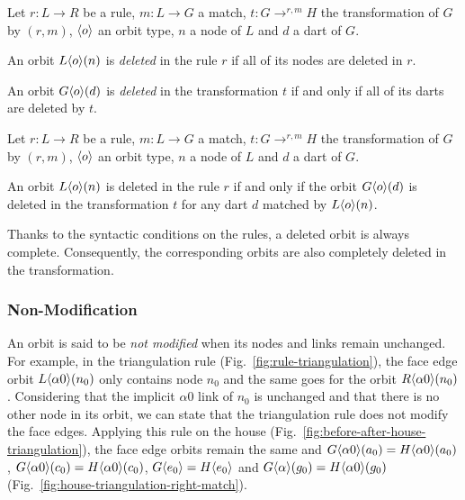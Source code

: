 \begin{definition}
    Let $r : L \longrightarrow R$ be a rule, $m : L \to G$ a match, $t : G \longrightarrow^{r,m} H$ the transformation of $G$ by $(r,m)$, $\langle o\rangle$ an orbit type, $n$ a node of $L$ and $d$ a dart of $G$.

    An orbit $L\langle o\rangle(n)$ is \emph{deleted} in the rule $r$ if all of its nodes are deleted in $r$.

    An orbit $G\langle o\rangle(d)$ is \emph{deleted} in the transformation $t$ if and only if all of its darts are deleted by $t$.
\end{definition}

\begin{proposition}
   Let $r : L \longrightarrow R$ be a rule, $m : L \to G$ a match, $t : G \longrightarrow^{r,m} H$ the transformation of $G$ by $(r,m)$, $\langle o\rangle$ an orbit type, $n$ a node of $L$ and $d$ a dart of $G$.

   An orbit $L\langle o\rangle(n)$ is deleted in the rule $r$ if and only if the orbit $G\langle o\rangle(d)$ is deleted in the transformation $t$ for any dart $d$ matched by $L\langle o\rangle(n)$.
\end{proposition}

\begin{proofidea}
  Thanks to the syntactic conditions on the rules, a deleted orbit is always complete.
  Consequently, the corresponding orbits are also completely deleted in the transformation.
\end{proofidea}


\subsubsection{Non-Modification}

An orbit is said to be \emph{not modified} when its nodes and links remain unchanged.
For example, in the triangulation rule (Fig.~\ref{fig:rule-triangulation}), the face edge orbit $L\langle\alpha 0\rangle(n_{0})$ only contains node $n_{0}$  and the same goes for the orbit $R\langle\alpha 0\rangle(n_{0})$.
Considering that the implicit $\alpha 0$ link of $n_{0}$ is unchanged and that there is no
other node in its orbit, we can state that the triangulation rule does not modify the face edges.
Applying this rule on the house (Fig.~\ref{fig:before-after-house-triangulation}), the face edge orbits remain the same and $G\langle\alpha 0\rangle(a_{0}) = H\langle\alpha 0\rangle(a_{0})$, $G\langle\alpha 0\rangle(c_{0}) = H\langle\alpha 0\rangle(c_{0})$, $G\langle e_{0}\rangle = H\langle e_{0}\rangle$ and $G\langle\alpha\rangle(g_{0}) = H\langle\alpha 0\rangle(g_{0})$ (Fig.~\ref{fig:house-triangulation-right-match}).

